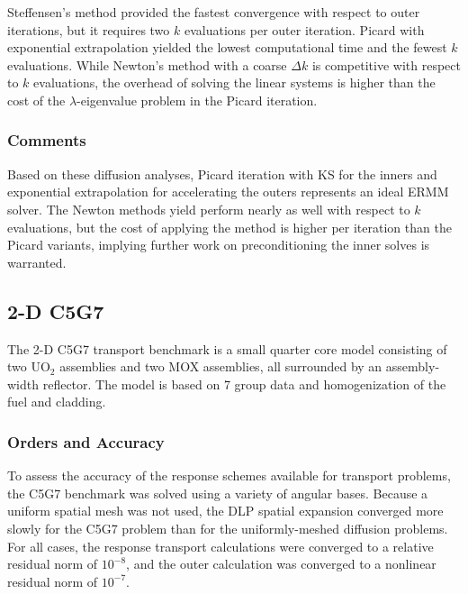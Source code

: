 Steffensen's method provided the fastest convergence with respect to 
outer iterations, but it requires two $k$ evaluations per outer iteration.
Picard with exponential extrapolation yielded the lowest computational 
time and the fewest $k$ evaluations.  While Newton's method with a 
coarse $\Delta k$ is competitive with respect to $k$ evaluations, the 
overhead of solving the linear systems is higher than the cost of the 
$\lambda$-eigenvalue problem in the Picard iteration.


\subsubsection{Comments}

Based on these diffusion analyses, Picard iteration with
KS for the inners and exponential extrapolation for accelerating 
the outers represents an ideal ERMM solver.  The Newton methods yield 
perform 
nearly as well with respect to $k$ evaluations, but the cost of 
applying the method is higher per iteration than the Picard variants,
implying further work on preconditioning the inner solves is warranted.

\subsection{2-D C5G7}

The 2-D C5G7 transport benchmark is a small quarter core 
model consisting of two UO$_2$ assemblies and two MOX
assemblies, all surrounded by an assembly-width reflector.  The model 
is based on 7 group data and homogenization of the fuel and cladding.
 
\subsubsection{Orders and Accuracy}
 
To assess the accuracy of the response schemes available for transport 
problems, the C5G7 benchmark was solved using a variety of 
angular bases. Because a uniform spatial mesh was 
not used, the DLP spatial expansion converged more slowly for 
the C5G7 problem than for the 
uniformly-meshed diffusion problems.  For all cases, 
the response transport calculations were converged to 
a relative residual norm of $10^{-8}$, and the outer calculation was 
converged to a nonlinear residual norm of $10^{-7}$.

